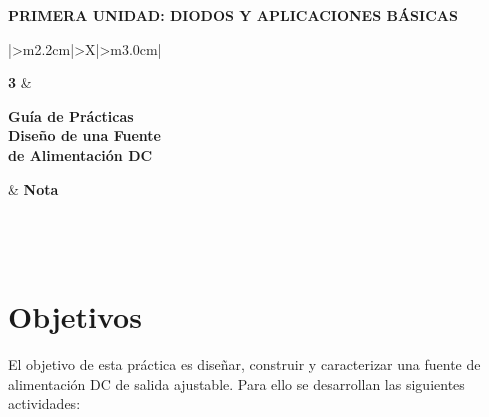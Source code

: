 \documentclass[11pt,a4paper]{article}
\begin{document}
\begin{center}
    {\normalsize\bfseries PRIMERA UNIDAD: DIODOS Y APLICACIONES BÁSICAS}
\end{center}

\vspace{0.55cm}

\begingroup
\renewcommand{\tabularxcolumn}[1]{m{#1}}
\renewcommand{\arraystretch}{2.0}
\setlength{\tabcolsep}{12pt}
\noindent
\begin{tabularx}{\textwidth}{|>{\centering\arraybackslash}m{2.2cm}|>{\centering\arraybackslash}X|>{\centering\arraybackslash}m{3.0cm}|}
\hline
\rule{0pt}{2.1cm}{\fontsize{58}{58}\selectfont\bfseries 3}
    & \begin{minipage}[c]{\linewidth}\centering
          {\large\bfseries Guía de Prácticas}\\[7pt]
          {\Large\bfseries Diseño de una Fuente\\ de Alimentación DC}
      \end{minipage}
    & {\Large\bfseries Nota}\\
\hline
{}\\
\hline
{}\\
\\
\hline
\end{tabularx}
\endgroup

\vspace{0.8cm}

\section{Objetivos}
El objetivo de esta práctica es diseñar, construir y caracterizar una fuente de
alimentación DC de salida ajustable. Para ello se desarrollan las siguientes actividades:
\end{document}
